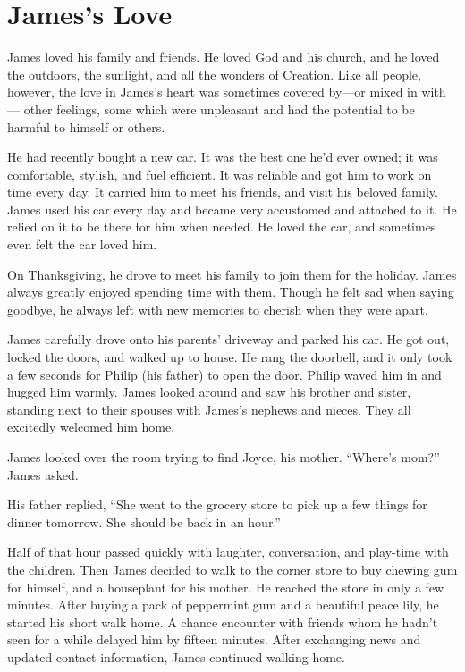 \chapter{James's Love}

James loved his family and friends. He loved God and his church, and he loved the outdoors, the sunlight, and all the wonders of Creation. Like all people, however, the love in James's heart was sometimes covered by—or mixed in with— other feelings, some which were unpleasant and had the potential to be harmful to himself or others.

He had recently bought a new car. It was the best one he'd ever owned; it was comfortable, stylish, and fuel efficient. It was reliable and got him to work on time every day. It carried him to meet his friends, and visit his beloved family. James used his car every day and became very accustomed and attached to it. He relied on it to be there for him when needed. He loved the car, and sometimes even felt the car loved him.

On Thanksgiving, he drove to meet his family to join them for the holiday. James always greatly enjoyed spending time with them. Though he felt sad when saying goodbye, he always left with new memories to cherish when they were apart.

James carefully drove onto his parents' driveway and parked his car. He got out, locked the doors, and walked up to house. He rang the doorbell, and it only took a few seconds for Philip (his father) to open the door. Philip waved him in and hugged him warmly. James looked around and saw his brother and sister, standing next to their spouses with James's nephews and nieces. They all excitedly welcomed him home.

James looked over the room trying to find Joyce, his mother. “Where's mom?” James asked.

His father replied, “She went to the grocery store to pick up a few things for dinner tomorrow. She should be back in an hour.”

Half of that hour passed quickly with laughter, conversation, and play-time with the children. Then James decided to walk to the corner store to buy chewing gum for himself, and a houseplant for his mother. He reached the store in only a few minutes. After buying a pack of peppermint gum and a beautiful peace lily, he started his short walk home. A chance encounter with friends whom he hadn't seen for a while delayed him by fifteen minutes. After exchanging news and updated contact information, James continued walking home.

